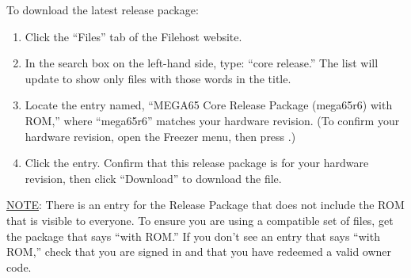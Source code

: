 \begin{center}
\end{center}

To download the latest release package:

\begin{enumerate}
  \item Click the ``Files'' tab of the Filehost website.
  \item In the search box on the left-hand side, type: ``core release.'' The list will update to show only files with those words in the title.
  \item Locate the entry named, ``MEGA65 Core Release Package (mega65r6) with ROM,'' where ``mega65r6'' matches your hardware revision. (To confirm your hardware revision, open the Freezer menu, then press .)
  \item Click the entry. Confirm that this release package is for your hardware revision, then click ``Download'' to download the file.
\end{enumerate}

\underline{NOTE}: There is an entry for the Release Package that does not include the ROM that is visible to everyone. To ensure you are using a compatible set of files, get the package that says ``with ROM.'' If you don't see an entry that says ``with ROM,'' check that you are signed in and that you have redeemed a valid owner code.

\begin{center}
\end{center}

